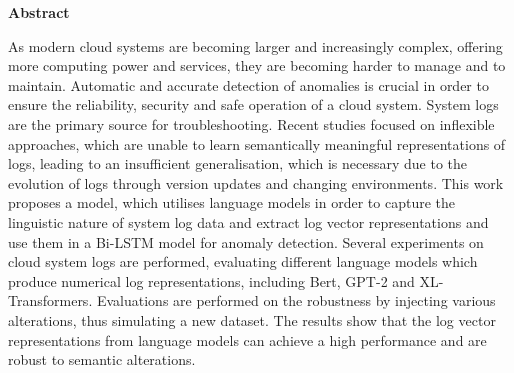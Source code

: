 \thispagestyle{empty}
\vspace*{1.0cm}

\begin{center}
    \textbf{Abstract}
\end{center}

\vspace*{0.5cm}

\noindent
As modern cloud systems are becoming larger and increasingly complex, offering more computing power and services, they are becoming harder to manage and to maintain. Automatic and accurate detection of anomalies is crucial in order to ensure the reliability, security and safe operation of a cloud system. System logs are the primary source for troubleshooting.  Recent studies focused on inflexible approaches, which are unable to learn semantically meaningful representations of logs, leading to an insufficient generalisation, which is necessary due to the evolution of logs through version updates and changing environments. This work proposes a model, which utilises language models in order to capture the linguistic nature of system log data and extract log vector representations and use them in a Bi-LSTM model for anomaly detection. Several experiments on cloud system logs are performed, evaluating different language models which produce numerical log representations, including Bert, GPT-2 and XL-Transformers. Evaluations are performed on the robustness by injecting various alterations, thus simulating a new dataset. The results show that the log vector representations from language models can achieve a high performance and are robust to semantic alterations.